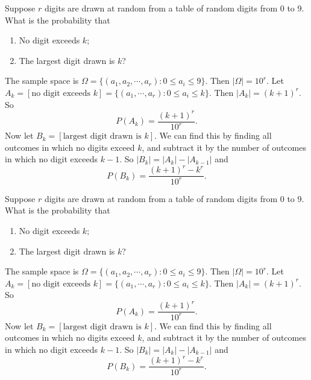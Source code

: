 \begin{note}
  \begin{field}
    \begin{eg}
      Suppose $r$ digits are drawn at random from a table of random digits from 0 to 9. What is the probability that
      \begin{enumerate}
        \item No digit exceeds $k$;
        \item The largest digit drawn is $k$?
      \end{enumerate}
      The sample space is $\Omega = \{(a_1, a_2, \cdots, a_r): 0 \leq a_i \leq 9\}$. Then $|\Omega| = 10^r$.
      Let $A_k = [\text{no digit exceeds }k] = \{(a_1, \cdots, a_r): 0 \leq a_i \leq k\}$. Then $|A_k| = (k + 1)^r$. So
      \[
        P(A_k) = \frac{(k + 1)^r}{10^r}.
      \]
      Now let $B_k = [\text{largest digit drawn is }k]$. We can find this by finding all outcomes in which no digits exceed $k$, and subtract it by the number of outcomes in which no digit exceeds $k - 1$. So $|B_k| = |A_k| - |A_{k - 1}|$ and
      \[
        P(B_k) = \frac{(k + 1)^r - k^r}{10^r}.
      \]
    \end{eg}
  \end{field}
  \begin{field}
    \begin{eg}
      Suppose $r$ digits are drawn at random from a table of random digits from 0 to 9. What is the probability that
      \begin{enumerate}
        \item No digit exceeds $k$;
        \item The largest digit drawn is $k$?
      \end{enumerate}
      The sample space is $\Omega = \{(a_1, a_2, \cdots, a_r): 0 \leq a_i \leq 9\}$. Then $|\Omega| = 10^r$.
      Let $A_k = [\text{no digit exceeds }k] = \{(a_1, \cdots, a_r): 0 \leq a_i \leq k\}$. Then $|A_k| = (k + 1)^r$. So
      \[
        P(A_k) = \frac{(k + 1)^r}{10^r}.
      \]
      Now let $B_k = [\text{largest digit drawn is }k]$. We can find this by finding all outcomes in which no digits exceed $k$, and subtract it by the number of outcomes in which no digit exceeds $k - 1$. So $|B_k| = |A_k| - |A_{k - 1}|$ and
      \[
        P(B_k) = \frac{(k + 1)^r - k^r}{10^r}.
      \]
    \end{eg}
  \end{field}
  \xplain{}%
\end{note}

